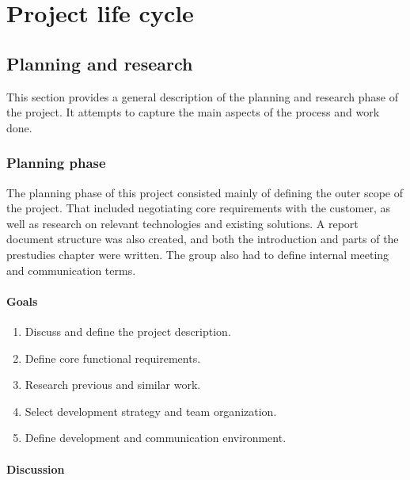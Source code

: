 
\chapter{Project life cycle}
\label{ch:project_lifecycle}

\section{Planning and research}
\label{sec:project_lifecycle-planning_and_research}

This section provides a general description of the planning and research phase of the project. It attempts to capture the main aspects of the process and work done.

\subsection{Planning phase}
\label{subsec:project_lifecycle-planning_and_research-planning_phase}

The planning phase of this project consisted mainly of defining the outer scope of the project. That included negotiating core requirements with the customer, as well as research on relevant technologies and existing solutions. A report document structure was also created, and both the introduction and parts of the prestudies chapter were written. The group also had to define internal meeting and communication terms.

\subsubsection{Goals}
\label{subsec:project_lifecycle-planning_and_research-planning_phase-goals}

\begin{enumerate}
\item Discuss and define the project description.
\item Define core functional requirements.
\item Research previous and similar work.
\item Select development strategy and team organization.
\item Define development and communication environment.
\end{enumerate}

\subsubsection{Discussion}
\label{subsec:project_lifecycle-planning_and_research-planning_phase-discussion}

